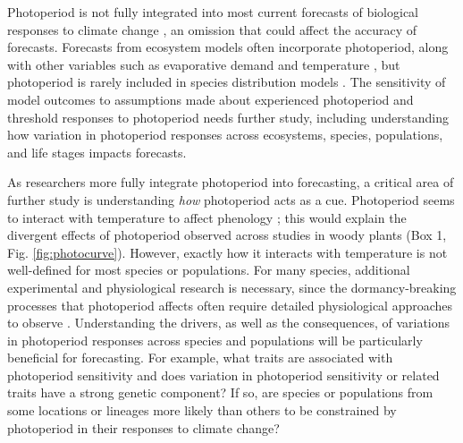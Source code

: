 \documentclass{article}
\begin{document}
\par Photoperiod is not fully integrated into most current forecasts of biological responses to climate change \citep[but see][]{tobin2008}, an omission that could affect the accuracy of forecasts. Forecasts from ecosystem models often incorporate photoperiod, along with other variables such as evaporative demand and temperature \citep [e.g., the Ecosystem Demography model] []{jolly2005,medvigy2013}, but photoperiod is rarely included in species distribution models \citep [e.g.,] []{morin2009,zhu2012}. The sensitivity of model outcomes to assumptions made about experienced photoperiod and threshold responses to photoperiod needs further study, including understanding how variation in photoperiod responses across ecosystems, species, populations, and life stages impacts forecasts. %

\par As researchers more fully integrate photoperiod into forecasting, a critical area of further study is understanding \emph{how} photoperiod acts as a cue. Photoperiod seems to interact with temperature to affect phenology \citep[e.g., Box 1,][]{zydlewski2014}; this would explain the divergent effects of photoperiod observed across studies in woody plants (Box 1, Fig. \ref{fig:photocurve}). However, exactly how it interacts with temperature is not well-defined for most species or populations. For many species, additional experimental and physiological research is necessary, since the dormancy-breaking processes that photoperiod affects often require detailed physiological approaches to observe \citep[Box 2,][]{hanninen2019, chuine2016}. Understanding the drivers, as well as the consequences, of variations in photoperiod responses across species and populations will be particularly beneficial for forecasting. For example, what traits are associated with photoperiod sensitivity and does variation in photoperiod sensitivity or related traits have a strong genetic component? If so, are species or populations from some locations or lineages more likely than others to be constrained by photoperiod in their responses to climate change?
\end{document}
